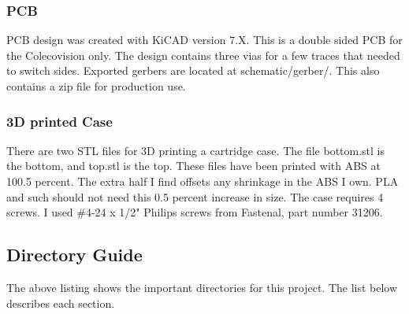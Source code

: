 \documentclass{article}
\begin{document}
  \subsubsection{PCB}

  \par
  PCB design was created with KiCAD version 7.X. This is a double sided PCB for the Colecovision only. The
  design contains three vias for a few traces that needed to switch sides. Exported gerbers are located at
  schematic/gerber/. This also contains a zip file for production use.

  \subsubsection{3D printed Case}

  \par
  There are two STL files for 3D printing a cartridge case. The file bottom.stl is the bottom, and top.stl is the top.
  These files have been printed with ABS at 100.5 percent. The extra half I find offsets any shrinkage in the ABS I own.
  PLA and such should not need this 0.5 percent increase in size. The case requires 4 screws. I used \#4-24 x 1/2"
  Philips screws from Fastenal, part number 31206.

  \subsection{Directory Guide}


  \vspace{\baselineskip}

  \par
  The above listing shows the important directories for this project. The list below describes each section.
\end{document}

